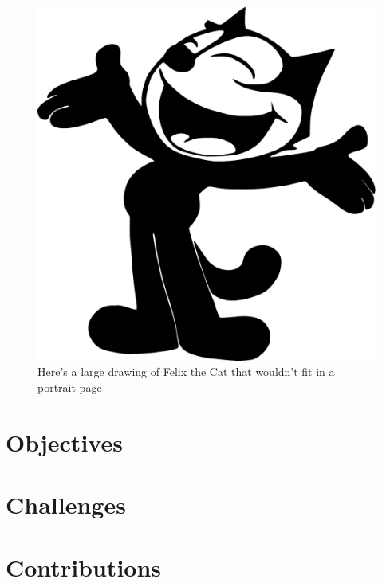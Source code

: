 \begin{landscape}
	\begin{figure}[htbp]
\centering
\includegraphics[width=0.4\linewidth]{introduction/fig/Felix_the_cat.pdf}
\caption{Here's a large drawing of Felix the Cat that wouldn't fit in a portrait page}
\label{fig:felix2}
\end{figure}
\end{landscape}

\section{Objectives}
\section{Challenges}
\section{Contributions}